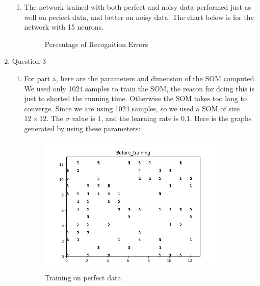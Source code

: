 \documentclass[11pt]{article}
\begin{document}
\begin{enumerate}
\begin{enumerate}
\item The network trained with both perfect and noisy data performed just as well on perfect data, and better on noisy data. The chart below is for the network with 15 neurons.\\
\begin{figure}[h!]
    \centering
        \caption{Percentage of Recognition Errors}
\end{figure}

\end{enumerate}

\pagebreak
\item Question 3

\begin{enumerate}
\item For part a, here are the parameters and dimension of the SOM computed. We used only 1024 samples to train the SOM, the reason for doing this is just to shorted the running time. Otherwise the SOM takes too long to converge. Since we are using 1024 samples, so we used a SOM of size $12 \times 12$. The $\sigma$ value is $1$, and the learning rate is $0.1$. Here is the graphs generated by using these parameters:\\
\begin{figure}[h!]
    \centering
    \begin{minipage}{0.45\textwidth}
    	\centering
        \includegraphics[width=0.9\textwidth]{Before_training}
        \caption{Training on perfect data}
    \end{minipage}\hfill
    \begin{minipage}{0.45\textwidth}
    	\centering

\end{minipage}
\end{figure}
\end{enumerate}
\end{enumerate}
\end{document}
